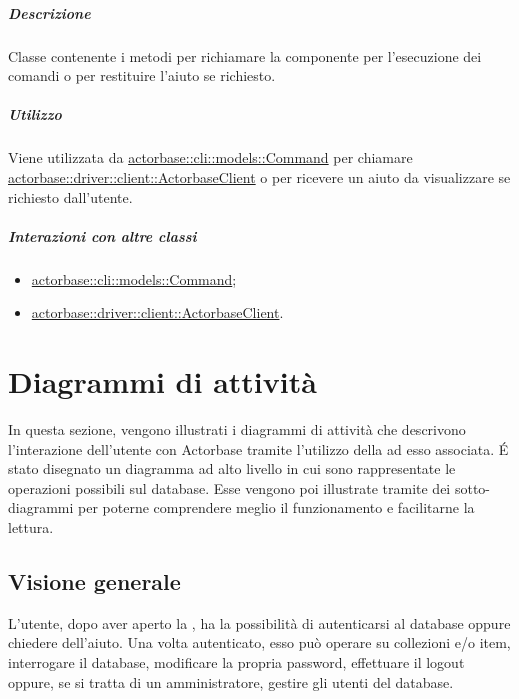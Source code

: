 \documentclass{scalatekids-article}
\begin{document}
\subparagraph{Descrizione}

Classe contenente i metodi per richiamare la componente  per
l'esecuzione dei comandi o per restituire l'aiuto se richiesto.

\subparagraph{Utilizzo}

Viene utilizzata da \hyperref[sec:actorbase::cli::models::Command]{actorbase::cli::models::Command} per chiamare
\hyperref[sec:actorbase::driver::client::ActorbaseClient]{actorbase::driver::client::ActorbaseClient} o per ricevere un aiuto da
visualizzare se richiesto dall'utente.

\subparagraph{Interazioni con altre classi}

\begin{itemize}
\item \hyperref[sec:actorbase::cli::models::Command]{actorbase::cli::models::Command};
\item \hyperref[sec:actorbase::driver::client::ActorbaseClient]{actorbase::driver::client::ActorbaseClient}.
\end{itemize}

\section{Diagrammi di attività}

In questa sezione, vengono illustrati i diagrammi di attività che descrivono
l'interazione dell'utente con Actorbase tramite l'utilizzo della 
ad esso associata.  É stato disegnato un diagramma ad alto livello in cui sono
rappresentate le operazioni possibili sul database. Esse vengono poi
illustrate tramite dei sotto-diagrammi per poterne comprendere meglio il
funzionamento e facilitarne la lettura.

\subsection{Visione generale}

L'utente, dopo aver aperto la , ha la possibilità di autenticarsi
al database oppure chiedere dell'aiuto. Una volta autenticato, esso può
operare su collezioni e/o item, interrogare il database, modificare la propria
password, effettuare il logout oppure, se si tratta di un amministratore,
gestire gli utenti del database.
\end{document}
